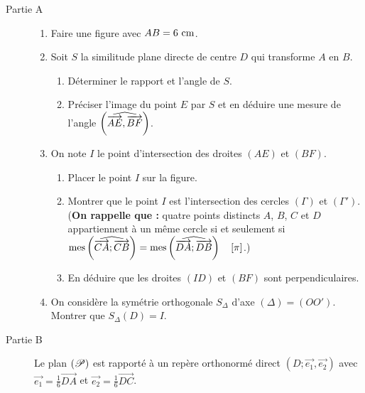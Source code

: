       \begin{description}
            \item[Partie A]
                  \begin{enumerate}
                        \item Faire une figure avec $AB = 6~\mathrm{cm}$.
                        \item Soit $S$ la similitude plane directe de centre $D$ qui transforme $A$ en $B$.
                              \begin{enumerate}
                                    \item D\'eterminer le rapport et l'angle de $S$.
                                    \item Pr\'eciser l'image du point $E$ par $S$ et en d\'eduire une mesure de l'angle 
                                          $\left( \widehat{ \overrightarrow{AE} , \overrightarrow{BF} } \right)$.
                              \end{enumerate}
                        \item On note $I$ le point d'intersection des droites $(AE)$ et $(BF)$.
                              \begin{enumerate}
                                    \item Placer le point $I$ sur la figure.
                                    \item Montrer que le point $I$ est l'intersection des cercles $(\Gamma)$ et $(\Gamma ')$.
                                          \newline
                                          (\textbf{On rappelle que :} quatre points distincts $A$, $B$, $C$ et $D$
                                          appartiennent \`a un m\^eme cercle si et seulement si 
                                          $\mathrm{mes}\left( \widehat{ \overrightarrow{CA} ; \overrightarrow{CB} } \right) = \mathrm{mes}\left( \widehat{ \overrightarrow{DA} ; \overrightarrow{DB} } \right) \quad [\pi] $.)
                                    \item En d\'eduire que les droites $(ID)$ et $(BF)$ sont perpendiculaires.
                              \end{enumerate}
                        \item On consid\`ere la sym\'etrie orthogonale $S_{\Delta}$ d'axe $(\Delta) = (OO')$.
                              Montrer que $S_{\Delta} (D) = I$.
                  \end{enumerate}
            \item[Partie B]
                  Le plan $(\mathscr{P})$ est rapport\'e \`a un rep\`ere orthonorm\'e direct $(D ; \vec{e_1} , \vec{e_2})$
                  avec $\vec{e_1} = \frac{1}{6} \overrightarrow{DA}$ et $\vec{e_2} = \frac{1}{6} \overrightarrow{DC}$.

\end{description}
